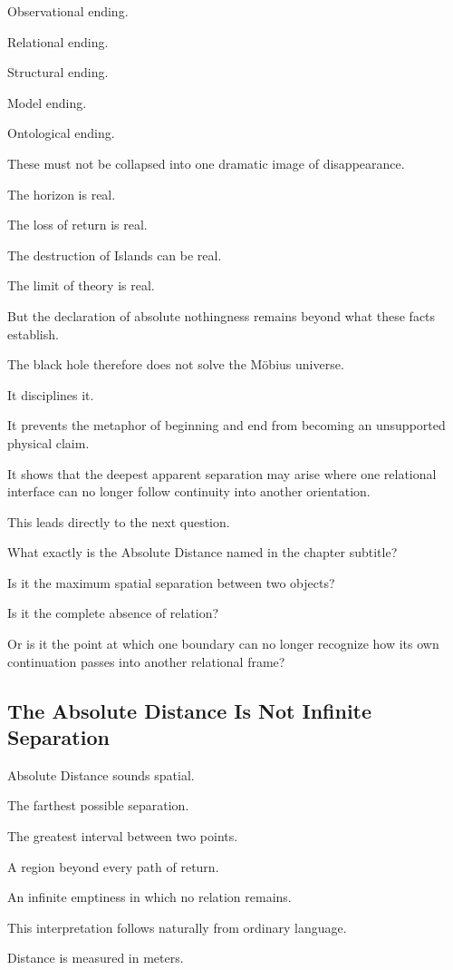 Observational ending.

Relational ending.

Structural ending.

Model ending.

Ontological ending.

These must not be collapsed into one dramatic image of disappearance.

The horizon is real.

The loss of return is real.

The destruction of Islands can be real.

The limit of theory is real.

But the declaration of absolute nothingness remains beyond what these facts establish.

The black hole therefore does not solve the Möbius universe.

It disciplines it.

It prevents the metaphor of beginning and end from becoming an unsupported physical claim.

It shows that the deepest apparent separation may arise where one relational interface can no longer follow continuity into another orientation.

This leads directly to the next question.

What exactly is the Absolute Distance named in the chapter subtitle?

Is it the maximum spatial separation between two objects?

Is it the complete absence of relation?

Or is it the point at which one boundary can no longer recognize how its own continuation passes into another relational frame?

\subsection*{\textbf{The Absolute Distance Is Not Infinite Separation}} 
Absolute Distance sounds spatial.

The farthest possible separation.

The greatest interval between two points.

A region beyond every path of return.

An infinite emptiness in which no relation remains.

This interpretation follows naturally from ordinary language.

Distance is measured in meters.

